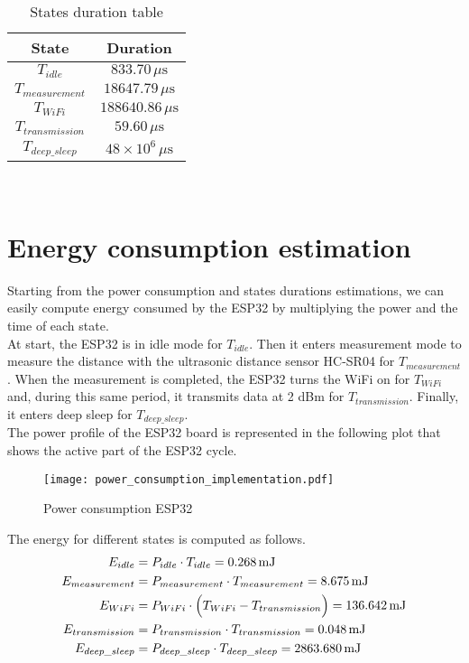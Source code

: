 \begin{table}[H]
\centering 
\begin{tabular}{| c | c |}
	\hline 
	\rowcolor{bluepoli!40}
	\textbf{State} & \textbf{Duration}\T\B \\
	\hline 
	$T_{idle}$ & $833.70\,\mu\text{s}$ \T\B\\
	$T_{measurement}$ & $18647.79\,\mu\text{s}$ \T\B\\
	$T_{WiFi}$ & $188640.86\,\mu\text{s}$ \T\B\\
	$T_{transmission}$ & $59.60\,\mu\text{s}$ \T\B\\
	$T_{deep\_sleep}$  & $48\times10^6\,\mu\text{s}$ \T\B\\
	\hline
\end{tabular}
\\[10pt]
\caption{States duration table}
\label{table:states_duration_table}
\end{table}

\section{Energy consumption estimation}
Starting from the power consumption and states durations estimations, we can easily compute energy consumed by the ESP32 by multiplying the power and the time of each state.\\
At start, the ESP32 is in idle mode for $T_{idle}$. Then it enters measurement mode to measure the distance with the ultrasonic distance sensor HC-SR04 for $T_{measurement}$. When the measurement is completed, the ESP32 turns the WiFi on for $T_{WiFi}$ and, during this same period, it transmits data at 2 dBm for $T_{transmission}$. Finally, it enters deep sleep for $T_{deep\_sleep}$. \\
The power profile of the ESP32 board is represented in the following plot that shows the active part of the ESP32 cycle.

\begin{figure}[H]
    \centering
    \texttt{[image: power\_consumption\_implementation.pdf]}
    \caption{Power consumption ESP32}
    \label{fig:Power consumption ESP32}
\end{figure}

The energy for different states is computed as follows.
\begin{align*}
	E_{idle} &= P_{idle} \cdot T_{idle} = 0.268 \,\text{mJ} \\ 
	E_{measurement} &= P_{measurement} \cdot T_{measurement} = 8.675 \,\text{mJ} \\
	E_{WiFi} &= P_{WiFi} \cdot \Bigl(T_{WiFi} - T_{transmission} \Bigr) = 136.642\,\text{mJ} \\
	E_{transmission} &= P_{transmission} \cdot T_{transmission} = 0.048\,\text{mJ} \\
   	E_{deep\_sleep} &= P_{deep\_sleep} \cdot T_{deep\_sleep} = 2863.680\,\text{mJ} 
\end{align*}

